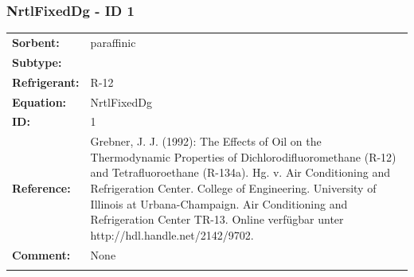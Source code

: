 \subsubsection{NrtlFixedDg - ID 1}
%
\begin{tabular}[l]{|lp{11.5cm}|}
\hline
\addlinespace

\textbf{Sorbent:} & paraffinic \\
\textbf{Subtype:} &  \\
\textbf{Refrigerant:} & R-12 \\
\textbf{Equation:} & NrtlFixedDg \\
\textbf{ID:} & 1 \\
\textbf{Reference:} & Grebner, J. J. (1992): The Effects of Oil on the Thermodynamic Properties of Dichlorodifluoromethane (R-12) and Tetrafluoroethane (R-134a). Hg. v. Air Conditioning and Refrigeration Center. College of Engineering. University of Illinois at Urbana-Champaign. Air Conditioning and Refrigeration Center TR-13. Online verfügbar unter http://hdl.handle.net/2142/9702. \\
\textbf{Comment:} & None \\

\addlinespace
\hline
\end{tabular}
\newline

